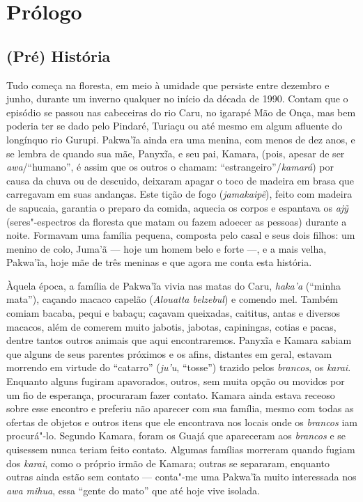 \chapter{Prólogo}\label{pruxf3logo}

\section{(Pré) História}\label{pruxe9-histuxf3ria}

Tudo começa na floresta, em meio à umidade que persiste entre dezembro e
junho, durante um inverno qualquer no início da década de 1990. Contam
que o episódio se passou nas cabeceiras do rio Caru, no igarapé
Mão de Onça, mas bem poderia ter se dado pelo Pindaré, Turiaçu ou até
mesmo em algum afluente do longínquo rio Gurupi. Pakwa'ĩa ainda era uma
menina, com menos de dez anos, e se lembra de quando sua mãe, Panyxĩa, e
seu pai, Kamara, (pois, apesar de ser \emph{awa}/``humano'', é assim que
os outros o chamam: ``estrangeiro''/\emph{kamará}) por causa da chuva ou
de descuido, deixaram apagar o toco de madeira em brasa que carregavam
em suas andanças. Este tição de fogo (\emph{jamakaipẽ}), feito com
madeira de sapucaia, garantia o preparo da comida, aquecia os corpos e
espantava os \emph{ajỹ} (seres"-espectros da floresta que matam ou fazem
adoecer as pessoas) durante a noite. Formavam uma família pequena,
composta pelo casal e seus dois filhos: um menino de colo, Juma'ã --- hoje
um homem belo e forte ---, e a mais velha, Pakwa'ĩa, hoje mãe de três
meninas e que agora me conta esta história.

Àquela época, a família de Pakwa'ĩa vivia nas matas do Caru,
\emph{haka'a} (``minha mata''), caçando macaco capelão (\emph{Alouatta
belzebul}) e comendo mel. Também comiam bacaba, pequi e babaçu; caçavam
queixadas, caititus, antas e diversos macacos, além de comerem muito
jabotis, jabotas, capiningas, cotias e pacas, dentre tantos outros
animais que aqui encontraremos. Panyxĩa e Kamara sabiam que alguns de
seus parentes próximos e os afins, distantes em geral, estavam morrendo
em virtude do ``catarro'' (\emph{ju'u}, ``tosse'') trazido pelos
\emph{brancos}, os \emph{karai}. Enquanto alguns fugiram apavorados,
outros, sem muita opção ou movidos por um fio de esperança, procuraram
fazer contato. Kamara ainda estava receoso sobre esse encontro e
preferiu não aparecer com sua família, mesmo com todas as ofertas de
objetos e outros itens que ele encontrava nos locais onde os
\emph{brancos} iam procurá"-lo. Segundo Kamara, foram os Guajá que
apareceram aos \emph{brancos} e se quisessem nunca teriam feito contato. Algumas famílias morreram quando fugiam dos \emph{karai}, como
o próprio irmão de Kamara; outras se separaram, enquanto outras ainda
estão sem contato --- conta"-me uma Pakwa'ĩa muito interessada nos
\emph{awa mihua}, essa ``gente do mato'' que até hoje vive isolada.

